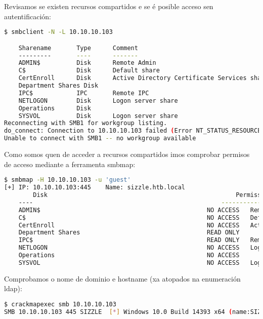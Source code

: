 \documentclass[a4paper]{article}
\begin{document}
        Revisamos se existen recursos compartidos e se é posible acceso sen autentificación:

        \begin{lstlisting}[language=Bash, caption=smbclient]
$ smbclient -N -L 10.10.10.103

	Sharename       Type      Comment
	---------       ----      -------
	ADMIN$          Disk      Remote Admin
	C$              Disk      Default share
	CertEnroll      Disk      Active Directory Certificate Services share
	Department Shares Disk      
	IPC$            IPC       Remote IPC
	NETLOGON        Disk      Logon server share 
	Operations      Disk      
	SYSVOL          Disk      Logon server share 
Reconnecting with SMB1 for workgroup listing.
do_connect: Connection to 10.10.10.103 failed (Error NT_STATUS_RESOURCE_NAME_NOT_FOUND)
Unable to connect with SMB1 -- no workgroup available\end{lstlisting}

        Como somos quen de acceder a recursos compartidos imos comprobar permisos de acceso mediante a ferramenta smbmap:
        \begin{lstlisting}[language=Bash, caption=smbmap]
$ smbmap -H 10.10.10.103 -u 'guest'                       
[+] IP: 10.10.10.103:445	Name: sizzle.htb.local                                  
        Disk                                                  	Permissions	Comment
	----                                                  	-----------	-------
	ADMIN$                                            	NO ACCESS	Remote Admin
	C$                                                	NO ACCESS	Default share
	CertEnroll                                        	NO ACCESS	Active Directory Certificate Services share
	Department Shares                                 	READ ONLY	
	IPC$                                              	READ ONLY	Remote IPC
	NETLOGON                                          	NO ACCESS	Logon server share 
	Operations                                        	NO ACCESS	
	SYSVOL                                            	NO ACCESS	Logon server share\end{lstlisting}

        Comprobamos o nome de dominio e hostname (xa atopados na enumeración ldap):
        \begin{lstlisting}[language=Bash, caption=crackmapexec, linewidth=18.5cm]
$ crackmapexec smb 10.10.10.103
SMB 10.10.10.103 445 SIZZLE  [*] Windows 10.0 Build 14393 x64 (name:SIZZLE) (domain:HTB.LOCAL) (signing:True) (SMBv1:False)\end{lstlisting}
\end{document}
